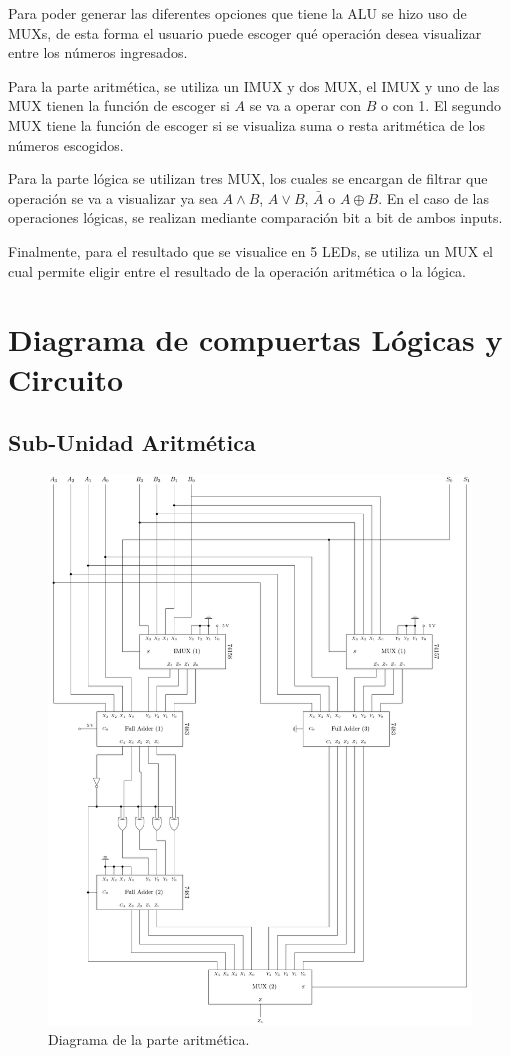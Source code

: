 \documentclass[journal, table]{IEEEtran}
\begin{document}
Para poder generar las diferentes opciones que tiene la ALU se hizo uso de MUXs,
de esta forma el usuario puede escoger qué operación desea visualizar entre los números ingresados.\cite{wakerly-1989}

Para la parte aritmética, se utiliza un IMUX y dos MUX, el IMUX y uno de las MUX
tienen la función de escoger si $A$ se va a operar con $B$ o con 1.
El segundo MUX tiene la función de escoger si se visualiza suma o resta aritmética de los números escogidos.

Para la parte lógica se utilizan tres MUX, los cuales se encargan de filtrar que
operación se va a visualizar ya sea $A \land B$, $A \lor B$, $\bar{A}$ o $A \oplus B$.
En el caso de las operaciones lógicas, se realizan mediante comparación bit a bit de ambos inputs.

Finalmente, para el resultado que se visualice en 5 LEDs, se utiliza un MUX
el cual permite eligir entre el resultado de la operación aritmética o la lógica.

\section{Diagrama de compuertas Lógicas y Circuito}
\subsection{Sub-Unidad Aritmética}
\begin{figure}[h]
    \centering
    \includegraphics[width=\linewidth]{./Images/arithmetische.pdf}
    \caption{Diagrama de la parte aritmética.}
    \label{fig:arithmetic-diagram}
\end{figure}
\end{document}

